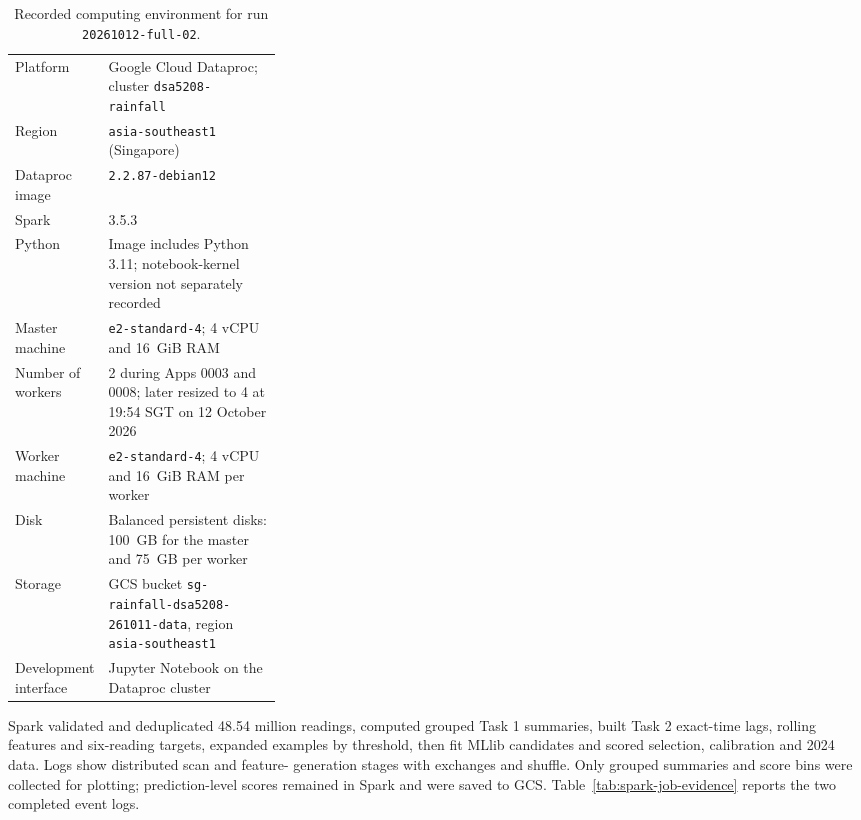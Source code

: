 \documentclass[11pt,a4paper]{article}
\newcommand{\runid}{20261012-full-02}
\begin{document}
\begin{table}[htbp]
\centering\small
\caption{Recorded computing environment for run \texttt{\runid}.}
\label{tab:computing-environment}
\begin{tabularx}{\linewidth}{@{}>{\raggedright\arraybackslash}p{0.31\linewidth}X@{}}
\toprule
Platform & Google Cloud Dataproc; cluster \texttt{dsa5208-rainfall} \\
Region & \texttt{asia-southeast1} (Singapore) \\
Dataproc image & \texttt{2.2.87-debian12} \\
Spark & 3.5.3 \\
Python & Image includes Python 3.11; notebook-kernel version not separately recorded~\cite{dataprocimage} \\
Master machine & \texttt{e2-standard-4}; 4 vCPU and 16~GiB RAM \\
Number of workers & 2 during Apps 0003 and 0008; later resized to 4 at 19:54 SGT on 12 October 2026 \\
Worker machine & \texttt{e2-standard-4}; 4 vCPU and 16~GiB RAM per worker \\
Disk & Balanced persistent disks: 100~GB for the master and 75~GB per worker \\
Storage & GCS bucket \texttt{sg-rainfall-dsa5208-261011-data}, region \texttt{asia-southeast1} \\
Development interface & Jupyter Notebook on the Dataproc cluster \\
\bottomrule
\end{tabularx}
\end{table}

\pagebreak
Spark validated and deduplicated 48.54 million readings, computed grouped Task 1
summaries, built Task 2 exact-time lags, rolling features and six-reading
targets, expanded examples by threshold, then fit MLlib candidates and scored
selection, calibration and 2024 data. Logs show distributed scan and feature-
generation stages with exchanges and shuffle. Only grouped summaries and score
bins were collected for plotting; prediction-level scores remained in Spark and
were saved to GCS. Table~\ref{tab:spark-job-evidence} reports the two completed
event logs.
\end{document}

